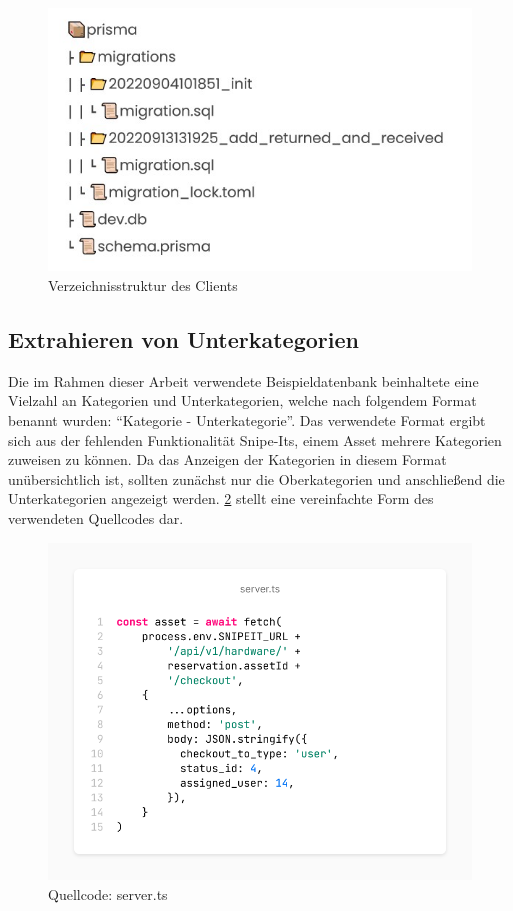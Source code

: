 \begin{figure}[h]
  \centering
  \includegraphics[scale=0.7]{Bilder/Db.jpg}
  \caption[Verzeichnisstruktur des Clients]{Verzeichnisstruktur des Clients}
  \label{fig:vue}
\end{figure}

\subsection{Extrahieren von Unterkategorien}
Die im Rahmen dieser Arbeit verwendete Beispieldatenbank beinhaltete eine Vielzahl an Kategorien und
Unterkategorien, welche nach folgendem Format benannt wurden: \enquote{Kategorie - Unterkategorie}.
Das verwendete Format ergibt sich aus der fehlenden Funktionalität Snipe-Its, einem Asset mehrere
Kategorien zuweisen zu können. Da das Anzeigen der Kategorien in diesem Format unübersichtlich ist,
sollten zunächst nur die Oberkategorien und anschließend die Unterkategorien angezeigt werden.
\ref{fig:categoriecode} stellt eine vereinfachte Form des verwendeten Quellcodes dar. 

\begin{figure}[h]
  \centering
  \includegraphics[scale=0.4]{Bilder/screenshot(5).png}
  \caption[Quellcode: server.ts]{Quellcode: server.ts}
  \label{fig:categoriecode}
\end{figure}

